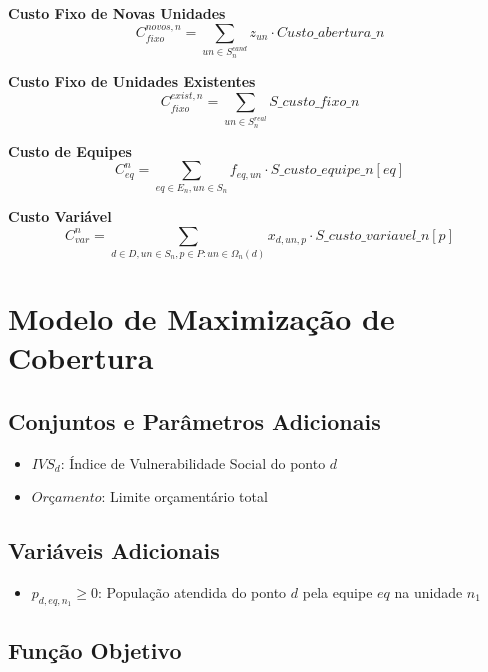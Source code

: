 \documentclass{article}
\begin{document}
\textbf{Custo Fixo de Novas Unidades}
\begin{equation}
C_{fixo}^{novos,n} = \sum_{un \in S_n^{cand}} z_{un} \cdot Custo\_abertura\_n
\end{equation}

\textbf{Custo Fixo de Unidades Existentes}
\begin{equation}
C_{fixo}^{exist,n} = \sum_{un \in S_n^{real}} S\_custo\_fixo\_n
\end{equation}

\textbf{Custo de Equipes}
\begin{equation}
C_{eq}^n = \sum_{eq \in E_n, un \in S_n} f_{eq,un} \cdot S\_custo\_equipe\_n[eq]
\end{equation}

\textbf{Custo Variável}
\begin{equation}
C_{var}^n = \sum_{d \in D, un \in S_n, p \in P: un \in \Omega_n(d)} x_{d,un,p} \cdot S\_custo\_variavel\_n[p]
\end{equation}

\section{Modelo de Maximização de Cobertura}

\subsection{Conjuntos e Parâmetros Adicionais}

\begin{itemize}
    \item $IVS_d$: Índice de Vulnerabilidade Social do ponto $d$
    \item $Orçamento$: Limite orçamentário total
\end{itemize}

\subsection{Variáveis Adicionais}

\begin{itemize}
    \item $p_{d,eq,n_1} \geq 0$: População atendida do ponto $d$ pela equipe $eq$ na unidade $n_1$
\end{itemize}

\subsection{Função Objetivo}
\end{document}
